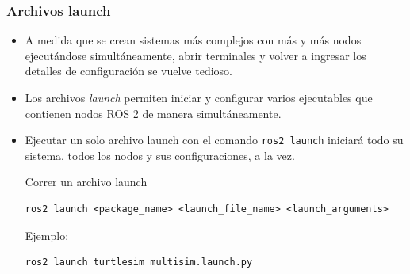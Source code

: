 \begin{frame}[fragile]
	\frametitle{Archivos launch}
	
    \begin{itemize}
        \item A medida que se crean sistemas más complejos con más y más nodos ejecutándose simultáneamente, abrir terminales y volver a ingresar los detalles de configuración se vuelve tedioso.

        \item Los archivos \emph{launch} permiten iniciar y configurar varios ejecutables que contienen nodos ROS 2 de manera simultáneamente.

        \item Ejecutar un solo archivo launch con el comando \lstinline[style=bash]{ros2 launch} iniciará todo su sistema, todos los nodos y sus configuraciones, a la vez.

Correr un archivo launch
\begin{lstlisting}[style=bash] 
ros2 launch <package_name> <launch_file_name> <launch_arguments>
\end{lstlisting}

Ejemplo:
\begin{lstlisting}[style=bash] 
ros2 launch turtlesim multisim.launch.py
\end{lstlisting}

    \end{itemize}
\end{frame}


